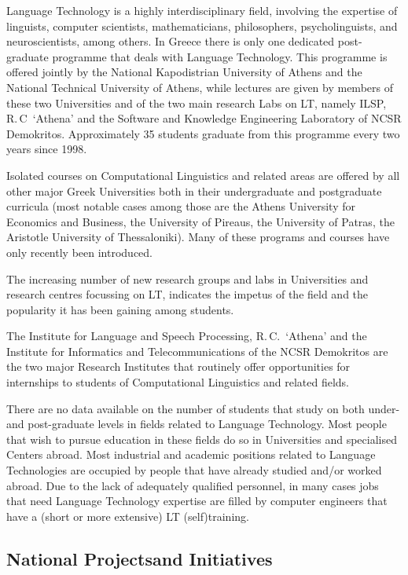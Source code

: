 \begin{multicols}{2}
Language Technology is a highly interdisciplinary field, involving the expertise of linguists, computer scientists, mathematicians, philosophers, psycholinguists, and neuroscientists, among others. In Greece there is only one dedicated post-graduate programme that deals with Language Technology. This programme is offered jointly by the National Kapodistrian University of Athens and the National Technical University of Athens, while lectures are given by members of these two Universities and of the two main research Labs on LT, namely ILSP, R.\,C~‘Athena’ and the Software and Knowledge Engineering Laboratory of NCSR Demokritos. Approximately 35 students graduate from this programme every two years since 1998.

Isolated courses on Computational Linguistics and related areas are offered by all other major Greek Universities both in their undergraduate and postgraduate curricula (most notable cases among those are the Athens University for Economics and Business, the University of Pireaus, the University of Patras, the Aristotle University of Thessaloniki). Many of these programs and courses have only recently been introduced.

The increasing number of new research groups and labs in Universities and research centres focussing on LT, indicates the impetus of the field and the popularity it has been gaining among students.

The Institute for Language and Speech Processing, R.\,C.~‘Athena’ and the Institute for Informatics and Telecommunications of the NCSR Demokritos are the two major Research Institutes that routinely offer opportunities for internships to students of Computational Linguistics and related fields.

There are no data available on the number of students that study on both under- and post-graduate levels in fields related to Language Technology. Most people that wish to pursue education in these fields do so in Universities and specialised Centers abroad. Most industrial and academic positions related to Language Technologies are occupied by people that have already studied and/or worked abroad. Due to the lack of adequately qualified personnel, in many cases jobs that need Language Technology expertise are filled by computer engineers that have a (short or more extensive) LT (self)training.

\subsection[National Projects and Initiatives]{National Projects\newline and Initiatives}


\end{multicols}
